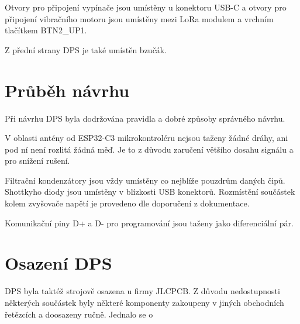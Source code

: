 Otvory pro připojení vypínače jsou umístěny u konektoru USB-C a otvory pro připojení vibračního motoru jsou umístěny mezi LoRa modulem a vrchním tlačítkem BTN2\_UP1. 

Z přední strany DPS je také umístěn bzučák. 

\section{Průběh návrhu}
Při návrhu DPS byla dodržována pravidla a dobré způsoby správného návrhu. %

V oblasti antény od ESP32-C3 mikrokontroléru nejsou taženy žádné dráhy, ani pod ní není rozlitá žádná měď. Je to z důvodu zaručení většího dosahu signálu a pro snížení rušení. 

Filtrační kondenzátory jsou vždy umístěny co nejblíže pouzdrům daných čipů. Shottkyho diody jsou umístěny v blízkosti USB konektorů. Rozmístění součástek kolem zvyšovače napětí 
je provedeno dle doporučení z dokumentace. 

Komunikační piny D+ a D- pro programování jsou taženy jako diferenciální pár.

\section{Osazení DPS}
DPS byla taktéž strojově osazena u firmy JLCPCB. Z důvodu nedostupnosti některých součástek byly některé komponenty zakoupeny v jiných obchodních řetězcích a doosazeny ručně. 
Jednalo se o %

